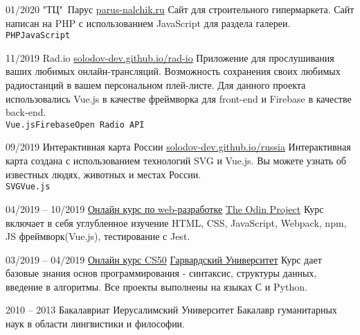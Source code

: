 \documentclass[9pt]{developercv} %
\begin{document}
\begin{entrylist}
   \entry
    {01/2020}
    {"ТЦ"\ Парус}
    {\href{https://parus-nalchik.ru}{parus-nalchik.ru}}
    {Сайт для строительного гипермаркета. Сайт написан на PHP с использованием JavaScript для раздела галереи.
\\ \texttt{PHP}\slashsep\texttt{JavaScript}}

 \entry
    {11/2019}
    {Rad.io}
    {\href{https://solodov-dev.github.io/rad-io}{solodov-dev.github.io/rad-io}}
    {Приложение для прослушивания ваших любимых онлайн-трансляций. Возможность сохранения своих любимых радиостанций в
вашем персональном плей-листе. Для данного проекта использовались Vue.js в качестве фреймворка для front-end и Firebase в качестве back-end.
\\ \texttt{Vue.js}\slashsep\texttt{Firebase}\slashsep\texttt{Open Radio API}}

 \entry
    {09/2019}
    {Интерактивная карта России}
    {\href{https://solodov-dev.github.io/russia}{solodov-dev.github.io/russia}}
    {Интерактивная карта создана с использованием технологий SVG и Vue.js. Вы можете узнать об известных людях, животных и местах России.\\ \texttt{SVG}\slashsep\texttt{Vue.js}}
\end{entrylist}


\begin{entrylist}
  \entry
      {04/2019 -- 10/2019}
      {\href{https://www.theodinproject.com}{Онлайн курс по web-разработке}}
      {\href{https://www.theodinproject.com}{The Odin Project}}
      {Курс включает в себя углубленное изучение HTML, CSS, JavaScript, Webpack, npm, JS фреймворк(Vue.js), тестирование с Jest.}

  \entry
      {03/2019 -- 04/2019}
      {\href{https://www.edx.org/course/cs50s-introduction-to-computer-science}{Онлайн курс CS50}}
      {\href{https://www.edx.org/course/cs50s-introduction-to-computer-science}{Гарвардский Университет}}
      {Курс дает базовые знания основ программирования - синтаксис, структуры данных, введение в алгоритмы. Все проекты выполнены на языках С и Python.}

  \entry
      {2010 -- 2013}
      {Бакалавриат}
      {Иерусалимский Университет}
      {Бакалавр гуманитарных наук в области лингвистики и философии.}
\end{entrylist}
\end{document}
